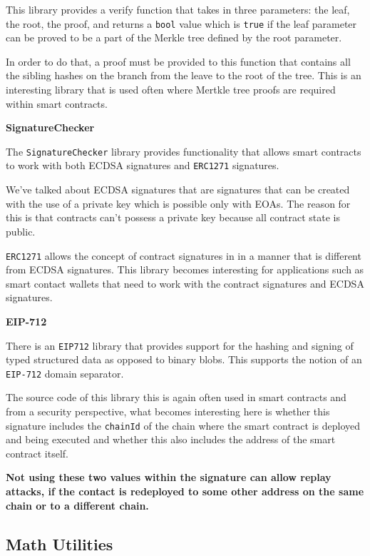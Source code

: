 This library provides a verify function that takes in three parameters:
the leaf, the root, the proof, and returns a \texttt{bool} value which
is \texttt{true} if the leaf parameter can be proved to be a part of the
Merkle tree defined by the root parameter.

In order to do that, a proof must be provided to this function that
contains all the sibling hashes on the branch from the leave to the root
of the tree. This is an interesting library that is used often where
Mertkle tree proofs are required within smart contracts.

\textbf{SignatureChecker}

The \texttt{SignatureChecker} library provides functionality that allows
smart contracts to work with both ECDSA signatures and \texttt{ERC1271}
signatures.

We've talked about ECDSA signatures that are signatures that can be
created with the use of a private key which is possible only with EOAs.
The reason for this is that contracts can't possess a private key
because all contract state is public.

\texttt{ERC1271} allows the concept of contract signatures in in a
manner that is different from ECDSA signatures. This library becomes
interesting for applications such as smart contact wallets that need to
work with the contract signatures and ECDSA signatures.

\textbf{EIP-712}

There is an \texttt{EIP712} library that provides support for the
hashing and signing of typed structured data as opposed to binary blobs.
This supports the notion of an \texttt{EIP-712} domain separator.

The source code of this library this is again often used in smart
contracts and from a security perspective, what becomes interesting here
is whether this signature includes the \texttt{chainId} of the chain
where the smart contract is deployed and being executed and whether this
also includes the address of the smart contract itself.

\textbf{Not using these two values within the signature can allow replay
attacks, if the contact is redeployed to some other address on the same
chain or to a different chain.}

\subsection{Math Utilities}\label{math-utilities}

